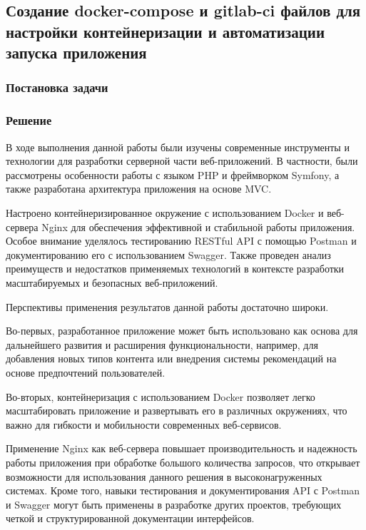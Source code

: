 \documentclass[pract]{SCWorks}
\begin{document}
\subsection{Создание docker-compose и gitlab-ci файлов для настройки
    контейнеризации и автоматизации запуска приложения}
\subsubsection{Постановка задачи}
\subsubsection{Решение}

\conclusion

В ходе выполнения данной работы были изучены современные инструменты и 
технологии для разработки серверной части веб-приложений. В частности, 
были рассмотрены особенности работы с языком PHP и фреймворком Symfony, 
а также разработана архитектура приложения на основе MVC. 

Настроено контейнеризированное окружение с использованием Docker и веб-сервера 
Nginx для обеспечения эффективной и стабильной работы приложения. Особое 
внимание уделялось тестированию RESTful API с помощью Postman и 
документированию его с использованием Swagger. Также проведен анализ 
преимуществ и недостатков применяемых технологий в контексте разработки 
масштабируемых и безопасных веб-приложений. 

Перспективы применения результатов данной работы достаточно широки. 

Во-первых, разработанное приложение может быть использовано как основа 
для дальнейшего развития и расширения функциональности, например, для 
добавления новых типов контента или внедрения системы рекомендаций на 
основе предпочтений пользователей. 

Во-вторых, контейнеризация с использованием Docker позволяет легко 
масштабировать приложение и развертывать его в различных окружениях, 
что важно для гибкости и мобильности современных веб-сервисов. 

Применение Nginx как веб-сервера повышает производительность и надежность 
работы приложения при обработке большого количества запросов, что открывает 
возможности для использования данного решения в высоконагруженных системах. 
Кроме того, навыки тестирования и документирования API с Postman и Swagger 
могут быть применены в разработке других проектов, требующих четкой и 
структурированной документации интерфейсов.
\end{document}
